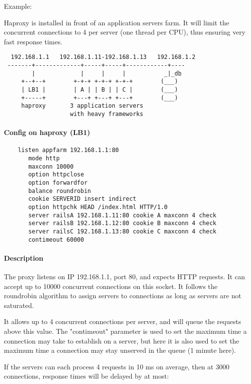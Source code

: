 Example:

Haproxy is installed in front of an application servers farm. It will limit
the concurrent connections to 4 per server (one thread per CPU), thus ensuring
very fast response times.

\begin{verbatim}
  192.168.1.1   192.168.1.11-192.168.1.13   192.168.1.2
 -------+-------------+-----+-----+------------+----
        |             |     |     |           _|_db
     +--+--+        +-+-+ +-+-+ +-+-+        (___)
     | LB1 |        | A | | B | | C |        (___)
     +-----+        +---+ +---+ +---+        (___)
     haproxy       3 application servers
                   with heavy frameworks
\end{verbatim}

\paragraph{Config on haproxy (LB1)}

\begin{verbatim}       
    listen appfarm 192.168.1.1:80
       mode http
       maxconn 10000
       option httpclose
       option forwardfor
       balance roundrobin
       cookie SERVERID insert indirect
       option httpchk HEAD /index.html HTTP/1.0
       server railsA 192.168.1.11:80 cookie A maxconn 4 check
       server railsB 192.168.1.12:80 cookie B maxconn 4 check
       server railsC 192.168.1.13:80 cookie C maxconn 4 check
       contimeout 60000
\end{verbatim}

\paragraph{Description}

The proxy listens on IP 192.168.1.1, port 80, and expects HTTP requests. It
can accept up to 10000 concurrent connections on this socket. It follows the
roundrobin algorithm to assign servers to connections as long as servers are
not saturated.

It allows up to 4 concurrent connections per server, and will queue the
requests above this value. The "contimeout" parameter is used to set the
maximum time a connection may take to establish on a server, but here it
is also used to set the maximum time a connection may stay unserved in the
queue (1 minute here).

If the servers can each process 4 requests in 10 ms on average, then at 3000
connections, response times will be delayed by at most:


